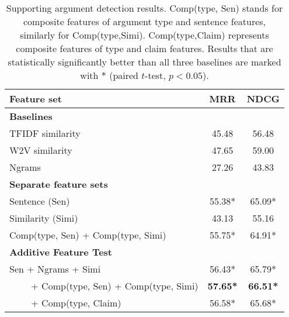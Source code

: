 \begin{table}[t]
{
\fontsize{9}{10}\selectfont
\setlength{\tabcolsep}{0.6mm}
\begin{tabular}{|l|c|c|}
    \hline
        Feature set & \textbf{MRR} & \textbf{NDCG} \\ \hline
        \multicolumn{1}{|l|}{\textbf{Baselines}} & &\\ 
        TFIDF similarity & 45.48 & 56.48 \\ 
        W2V similarity & 47.65 & 59.00 \\ 
        Ngrams & 27.26 & 43.83 \\ \hline \hline
        
        \multicolumn{1}{|l|}{\textbf{Separate feature sets}} & & \\ 
        Sentence (Sen) & 55.38* & 65.09* \\ 
        Similarity (Simi) & 43.13 & 55.16 \\ 
        Comp(type, Sen) + Comp(type, Simi) & 55.75* & 64.91* \\ \hline 
        
        \multicolumn{1}{|l|}{\textbf{Additive Feature Test}} & & \\ 
        Sen + Ngrams + Simi  & 56.43* & 65.79* \\ 
        ~~~~ + Comp(type, Sen) + Comp(type, Simi) & \textbf{57.65*} & \textbf{66.51*} \\ 
        ~~~~ + Comp(type, Claim) & 56.58* & 65.68* \\ \hline
\end{tabular}
\caption{\fontsize{10}{12}\selectfont Supporting argument detection results. %
Comp(type, Sen) stands for composite features of argument type and sentence features, similarly for Comp(type,Simi).  Comp(type,Claim) represents composite features of type and claim features. Results that are statistically significantly better than all three baselines are marked with $\ast$ (paired $t$-test, $p<0.05$).}
\label{tab:mainresult}
}
\end{table}


